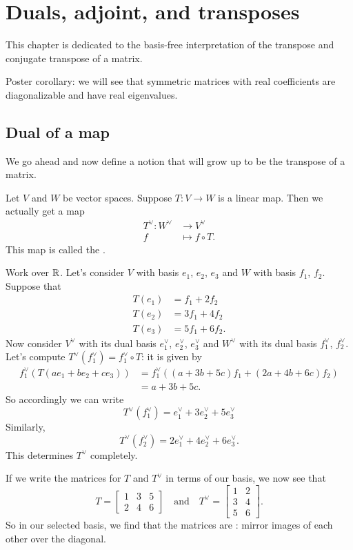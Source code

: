 \chapter{Duals, adjoint, and transposes}
\label{ch:duals_adjoint_transposes}
This chapter is dedicated to the basis-free interpretation
of the transpose and conjugate transpose of a matrix.

Poster corollary: we will see that
symmetric matrices with real coefficients
are diagonalizable and have real eigenvalues.

\section{Dual of a map}
We go ahead and now define a notion
that will grow up to be the transpose of a matrix.

\begin{definition}
	Let $V$ and $W$ be vector spaces.
	Suppose $T \colon V \to W$ is a linear map.
	Then we actually get a map
	\begin{align*}
		T^\vee \colon W^\vee &\to V^\vee \\
		f &\mapsto f \circ T.
	\end{align*}
	This map is called the .
\end{definition}

\begin{example}
	Work over $\mathbb R$.
	Let's consider $V$ with basis $e_1$, $e_2$, $e_3$
	and $W$ with basis $f_1$, $f_2$.
	Suppose that
	\begin{align*}
		T(e_1) &= f_1 + 2f_2 \\
		T(e_2) &= 3f_1 + 4f_2 \\
		T(e_3) &= 5f_1 + 6f_2.
	\end{align*}
	Now consider $V^\vee$ with its dual basis $e_1^\vee$,
	$e_2^\vee$, $e_3^\vee$
	and $W^\vee$ with its dual basis $f_1^\vee$, $f_2^\vee$.
	Let's compute $T^\vee(f_1^\vee) = f_1^\vee \circ T$:
	it is given by
	\begin{align*}
		f_1^\vee \left( T(ae_1 + be_2 + ce_3) \right)
		&= f_1^\vee\left( (a+3b+5c) f_1 + (2a+4b+6c) f_2 \right) \\
		&= a + 3b + 5c.
	\end{align*}
	So accordingly we can write
	\[ T^\vee(f_1^\vee) = e_1^\vee + 3e_2^\vee + 5e_3^\vee \]
	Similarly,
	\[ T^\vee(f_2^\vee) = 2e_1^\vee + 4e_2^\vee + 6e_3^\vee. \]
	This determines $T^\vee$ completely.
\end{example}
If we write the matrices for $T$ and $T^\vee$ in terms of our basis,
we now see that
\[ T = \begin{bmatrix}
		1 & 3 & 5 \\
		2 & 4 & 6
	\end{bmatrix}
	\quad\text{and}\quad
	T^\vee = \begin{bmatrix}
		1 & 2 \\
		3 & 4 \\
		5 & 6
	\end{bmatrix}.
\]
So in our selected basis,
we find that the matrices are :
mirror images of each other over the diagonal.

